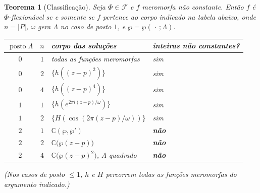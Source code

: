\documentclass[11pt,a4paper]{article}
\theoremstyle{plain}
\newtheorem{teorema}{Teorema}[section]
\theoremstyle{definition}
\theoremstyle{remark}
\newcommand{\C}{\mathbb{C}}
\newcommand{\FF}{\mathscr{F}}
\begin{document}
\begin{teorema}[Classificação]\label{thm:classificacao}
Seja $\Phi\in\FF$ e $f$ meromorfa não constante. Então $f$ é $\Phi$-flexionável
se e somente se $f$ pertence ao corpo indicado na tabela abaixo, onde
$n=|P|$, $\omega$ gera $\Lambda$ no caso de posto $1$, e $\wp=\wp(\,\cdot\,;\Lambda)$.
\begin{center}
\renewcommand{\arraystretch}{1.25}
\begin{tabular}{ccll}
\toprule
$\operatorname{posto}\Lambda$ & $n$ & corpo das soluções & inteiras não constantes?\\
\midrule
$0$ & $1$ & todas as funções meromorfas & sim\\
$0$ & $2$ & $\{h((z-p)^2)\}$ & sim\\
$0$ & $4$ & $\{h((z-p)^4)\}$ & sim\\
$1$ & $1$ & $\{h(e^{2\pi i (z-p)/\omega})\}$ & sim\\
$1$ & $2$ & $\{H(\cos(2\pi (z-p)/\omega))\}$ & sim\\
$2$ & $1$ & $\C(\wp,\wp')$ & \textbf{não}\\
$2$ & $2$ & $\C\bigl(\wp(z-p)\bigr)$ & \textbf{não}\\
$2$ & $4$ & $\C\bigl(\wp(z-p)^2\bigr)$, $\Lambda$ quadrado & \textbf{não}\\
\bottomrule
\end{tabular}
\end{center}
(Nos casos de posto $\le 1$, $h$ e $H$ percorrem todas as funções meromorfas do
argumento indicado.)
\end{teorema}
\end{document}
